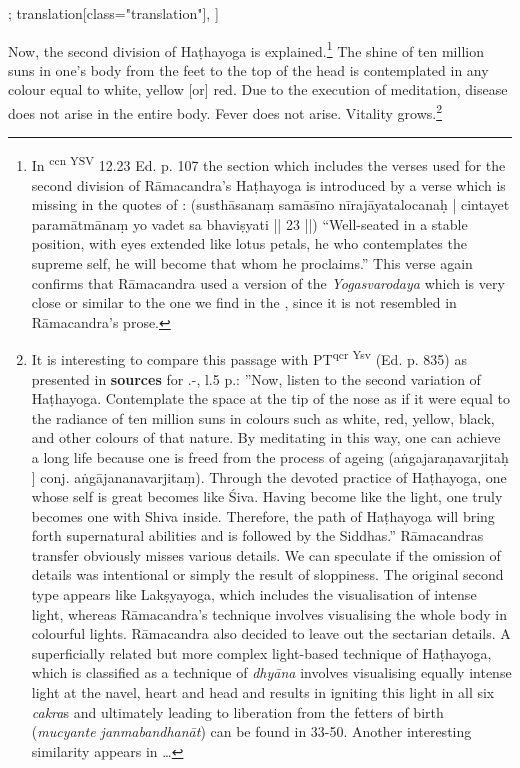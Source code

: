 \begin{alignment}[
  texts=edition[class="edition"];
  translation[class="translation"],
  ]
\begin{translation}
\begin{tlate}
        \indent Now, the second division of Haṭhayoga is explained.\footnote{In \textsuperscript{ccn \cdot YSV} 12.23 Ed. p. 107 the section which includes the verses used for the second division of Rāmacandra's Haṭhayoga is introduced by a verse which is missing in the quotes of : (susthāsanaṃ samāsīno nīrajāyatalocanaḥ | cintayet paramātmānaṃ yo vadet sa bhaviṣyati || 23 ||) ``Well-seated in a stable position, with eyes extended like lotus petals, he who contemplates the supreme self, he will become that whom he proclaims.'' This verse again confirms that Rāmacandra used a version of the \textit{Yogasvarodaya} which is very close or similar to the one we find in the , since it is not resembled in Rāmacandra's prose.} The shine of ten million suns in one's body from the feet to the top of the head is contemplated in any colour equal to white, yellow [or] red. Due to the execution of meditation, disease does not arise in the entire body.\textsuperscript{\coro{[\lowroman{10}]}}  Fever does not arise. Vitality grows.\footnote{It is interesting to compare this passage with PT\textsuperscript{qcr \cdot Ysv} (Ed. p. 835) as presented in \textbf{sources} for .-, l.5 p.\pageref{hathayoga}: ''Now, listen to the second variation of Haṭhayoga. Contemplate the space at the tip of the nose as if it were equal to the radiance of ten million suns in colours such as white, red, yellow, black, and other colours of that nature. By meditating in this way, one can achieve a long life because one is freed from the process of ageing (aṅgajaraṇavarjitaḥ ] conj. aṅgājananavarjitaṃ). Through the devoted practice of Haṭhayoga, one whose self is great becomes like Śiva. Having become like the light, one truly becomes one with Shiva inside. Therefore, the path of Haṭhayoga will bring forth supernatural abilities and is followed by the Siddhas.'' Rāmacandras transfer obviously misses various details. We can speculate if the omission of details was intentional or simply the result of sloppiness. The original second type appears like Lakṣyayoga, which includes the visualisation of intense light, whereas Rāmacandra's technique involves visualising the whole body in colourful lights. Rāmacandra also decided to leave out the sectarian details. A superficially related but more complex light-based technique of Haṭhayoga, which is classified as a technique of \textit{dhyāna} involves visualising equally intense light at the navel, heart and head and results in igniting this light in all six \textit{cakra}s and ultimately leading to liberation from the fetters of birth (\textit{mucyante janmabandhanāt}) can be found in  33-50. Another interesting similarity appears in \ldots}
        \end{tlate}
      \end{translation}
    \end{alignment}
